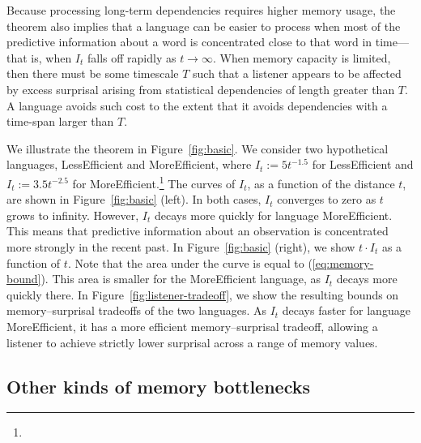 

Because processing long-term dependencies requires higher memory usage, the theorem also implies that a language can be easier to process when most of the predictive information about a word is concentrated close to that word in time---that is, when $I_t$ falls off rapidly as $t \rightarrow \infty$. When memory capacity is limited, then there must be some timescale $T$ such that a listener appears to be affected by excess surprisal arising from statistical dependencies of length greater than $T$. A language avoids such cost to the extent that it avoids dependencies with a time-span larger than $T$.

We illustrate the theorem in Figure~\ref{fig:basic}.
We consider two hypothetical languages, LessEfficient and MoreEfficient, where $I_t := 5t^{-1.5}$ for LessEfficient and $I_t := 3.5 t^{-2.5}$ for MoreEfficient.\footnote{}
The curves of $I_t$, as a function of the distance $t$, are shown in Figure~\ref{fig:basic} (left).
In both cases, $I_t$ converges to zero as $t$ grows to infinity. 
However, $I_t$ decays more quickly for language MoreEfficient.
This means that predictive information about an observation is concentrated more strongly in the recent past.
In Figure~\ref{fig:basic} (right), we show $t\cdot I_t$ as a function of $t$.
Note that the area under the curve is equal to (\ref{eq:memory-bound}).
This area is smaller for the MoreEfficient language, as $I_t$ decays more quickly there.  
In Figure~\ref{fig:listener-tradeoff}, we show the resulting bounds on memory--surprisal tradeoffs of the two languages.  
As $I_t$ decays faster for language MoreEfficient, it has a more efficient memory--surprisal tradeoff, allowing a listener to achieve strictly lower surprisal across a range of memory values.

\subsection{Other kinds of memory bottlenecks}

